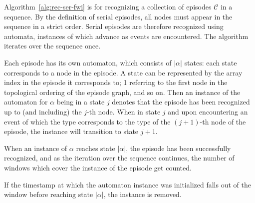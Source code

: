 Algorithm~\ref{alg:rec-ser-fwi} is for recognizing a collection of episodes $ \mathcal{C} $ in a sequence. By the definition of serial episodes, all nodes must appear in the sequence in a strict order. Serial episodes are therefore recognized using automata, instances of which advance as events are encountered. The algorithm iterates over the sequence once.

Each episode has its own automaton, which consists of $ | \alpha | $ states: each state corresponds to a node in the episode. A state can be represented by the array index in the episode it corresponds to; 1 referring to the first node in the topological ordering of the episode graph, and so on. Then an instance of the automaton for $ \alpha $ being in a state $ j $ denotes that the episode has been recognized up to (and including) the $ j $-th node. When in state $ j $ and upon encountering an event of which the type corresponds to the type of the $ (j + 1) $-th node of the episode, the instance will transition to state $ j + 1 $.

When an instance of $ \alpha $ reaches state $ | \alpha | $, the episode has been successfully recognized, and as the iteration over the sequence continues, the number of windows which cover the instance of the episode get counted.

If the timestamp at which the automaton instance was initialized falls out of the window before reaching state $ | \alpha | $, the instance is removed.

